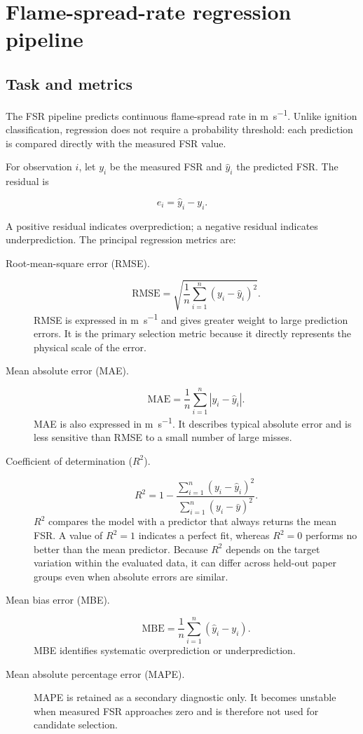 \section{Flame-spread-rate regression pipeline}
\label{sec:regression-method}

\subsection{Task and metrics}

The FSR pipeline predicts continuous flame-spread rate in
\si{\metre\per\second}. Unlike ignition classification, regression does not
require a probability threshold: each prediction is compared directly with the
measured FSR value.

For observation \(i\), let \(y_i\) be the measured FSR and
\(\widehat y_i\) the predicted FSR. The residual is

\[
e_i=\widehat y_i-y_i.
\]

A positive residual indicates overprediction; a negative residual indicates
underprediction. The principal regression metrics are:

\begin{description}
  \item[Root-mean-square error (RMSE).]
  \[
  \mathrm{RMSE}
  =
  \sqrt{\frac{1}{n}\sum_{i=1}^{n}
  \left(y_i-\widehat y_i\right)^2}.
  \]
  RMSE is expressed in \si{\metre\per\second} and gives greater weight to
  large prediction errors. It is the primary selection metric because it
  directly represents the physical scale of the error.

  \item[Mean absolute error (MAE).]
  \[
  \mathrm{MAE}
  =
  \frac{1}{n}\sum_{i=1}^{n}
  \left|y_i-\widehat y_i\right|.
  \]
  MAE is also expressed in \si{\metre\per\second}. It describes typical
  absolute error and is less sensitive than RMSE to a small number of large
  misses.

  \item[Coefficient of determination (\(R^2\)).]
  \[
  R^2
  =
  1-\frac{\sum_{i=1}^{n}(y_i-\widehat y_i)^2}
  {\sum_{i=1}^{n}(y_i-\bar y)^2}.
  \]
  \(R^2\) compares the model with a predictor that always returns the mean
  FSR. A value of \(R^2=1\) indicates a perfect fit, whereas \(R^2=0\)
  performs no better than the mean predictor. Because \(R^2\) depends on the
  target variation within the evaluated data, it can differ across held-out
  paper groups even when absolute errors are similar.

  \item[Mean bias error (MBE).]
  \[
  \mathrm{MBE}
  =
  \frac{1}{n}\sum_{i=1}^{n}
  \left(\widehat y_i-y_i\right).
  \]
  MBE identifies systematic overprediction or underprediction.

  \item[Mean absolute percentage error (MAPE).]
  MAPE is retained as a secondary diagnostic only. It becomes unstable when
  measured FSR approaches zero and is therefore not used for candidate
  selection.
\end{description}


